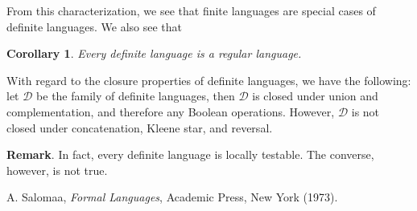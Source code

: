 \documentclass[12pt]{article}
\newtheorem{cor}{Corollary}
\begin{document}
From this characterization, we see that finite languages are special cases of definite languages.  We also see that
\begin{cor} Every definite language is a regular language. \end{cor}

With regard to the closure properties of definite languages, we have the following: let $\mathscr{D}$ be the family of definite languages, then $\mathscr{D}$ is closed under union and complementation, and therefore any Boolean operations.  However, $\mathscr{D}$ is not closed under concatenation, Kleene star, and reversal.

\textbf{Remark}.  In fact, every definite language is locally testable.  The converse, however, is not true.

\begin{thebibliography}{9}
 A. Salomaa, {\em Formal Languages}, Academic Press, New York (1973).
\end{thebibliography}
\end{document}
